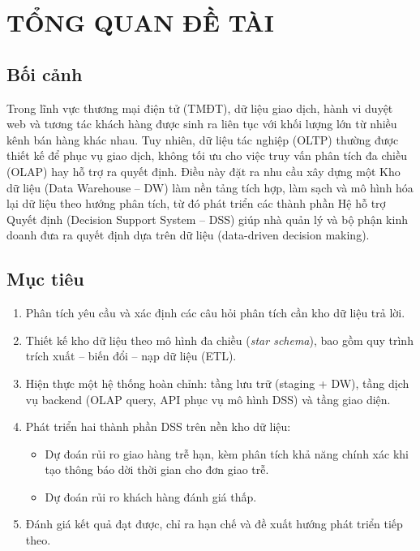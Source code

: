 \section{TỔNG QUAN ĐỀ TÀI}

\subsection{Bối cảnh}
\hspace{1cm}
Trong lĩnh vực thương mại điện tử (TMĐT), dữ liệu giao dịch, hành vi duyệt web và tương
tác khách hàng được sinh ra liên tục với khối lượng lớn từ nhiều kênh bán hàng khác nhau.
Tuy nhiên, dữ liệu tác nghiệp (OLTP) thường được thiết kế để phục vụ giao dịch, không tối ưu
cho việc truy vấn phân tích đa chiều (OLAP) hay hỗ trợ ra quyết định. Điều này đặt ra nhu
cầu xây dựng một Kho dữ liệu (Data Warehouse -- DW) làm nền tảng tích hợp, làm
sạch và mô hình hóa lại dữ liệu theo hướng phân tích, từ đó phát triển các thành phần
Hệ hỗ trợ Quyết định (Decision Support System -- DSS) giúp nhà quản lý và bộ phận
kinh doanh đưa ra quyết định dựa trên dữ liệu (data-driven decision making).

\subsection{Mục tiêu}
\begin{enumerate}
    \item Phân tích yêu cầu và xác định các câu hỏi phân tích cần kho dữ liệu trả lời.
    \item Thiết kế kho dữ liệu theo mô hình đa chiều (\textit{star schema}), bao gồm quy trình
          trích xuất -- biến đổi -- nạp dữ liệu (ETL).
    \item Hiện thực một hệ thống hoàn chỉnh: tầng lưu trữ (staging + DW), tầng dịch vụ
          backend (OLAP query, API phục vụ mô hình DSS) và tầng giao diện.
    \item Phát triển hai thành phần DSS trên nền kho dữ liệu: 
      \begin{itemize}
      \item Dự đoán rủi ro giao hàng trễ hạn, kèm phân tích khả năng chính xác khi tạo thông báo dời thời gian cho đơn giao trễ.
      \item Dự đoán rủi ro khách hàng đánh giá thấp.
      \end{itemize}
    \item Đánh giá kết quả đạt được, chỉ ra hạn chế và đề xuất hướng phát triển tiếp theo.
\end{enumerate}

